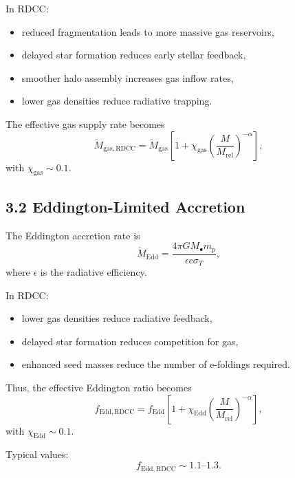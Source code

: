 \documentclass[11pt,a4paper]{article}
\begin{document}
In RDCC:

\begin{itemize}
    \item reduced fragmentation leads to more massive gas reservoirs,
    \item delayed star formation reduces early stellar feedback,
    \item smoother halo assembly increases gas inflow rates,
    \item lower gas densities reduce radiative trapping.
\end{itemize}

The effective gas supply rate becomes
\begin{equation}
    \dot{M}_{\mathrm{gas,RDCC}}
    = \dot{M}_{\mathrm{gas}}
      \left[
        1 + \chi_{\mathrm{gas}}
        \left(\frac{M}{M_{\mathrm{rel}}}\right)^{-\alpha}
      \right],
\end{equation}
with $\chi_{\mathrm{gas}} \sim 0.1$.

\subsection*{3.2 Eddington-Limited Accretion}

The Eddington accretion rate is
\begin{equation}
    \dot{M}_{\mathrm{Edd}}
    = \frac{4\pi G M_{\bullet} m_{p}}{\epsilon c \sigma_{T}},
\end{equation}
where $\epsilon$ is the radiative efficiency.

In RDCC:

\begin{itemize}
    \item lower gas densities reduce radiative feedback,
    \item delayed star formation reduces competition for gas,
    \item enhanced seed masses reduce the number of e-foldings required.
\end{itemize}

Thus, the effective Eddington ratio becomes
\begin{equation}
    f_{\mathrm{Edd,RDCC}}
    = f_{\mathrm{Edd}}
      \left[
        1 + \chi_{\mathrm{Edd}}
        \left(\frac{M}{M_{\mathrm{rel}}}\right)^{-\alpha}
      \right],
\end{equation}
with $\chi_{\mathrm{Edd}} \sim 0.1$.

Typical values:
\begin{equation}
    f_{\mathrm{Edd,RDCC}} \sim 1.1\text{--}1.3.
\end{equation}
\end{document}
